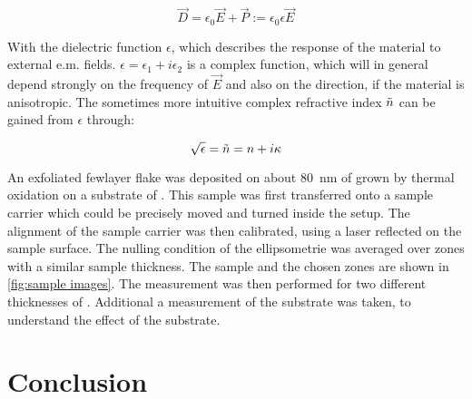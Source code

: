 \documentclass[english]{article}
\begin{document}
\begin{equation}
    \Vec{D}=\epsilon_0 \Vec{E} + \Vec{P} := \epsilon_0 \epsilon \Vec{E}
\end{equation}

With the dielectric function $\epsilon$, which describes the response of the material to external e.m. fields. $\epsilon=\epsilon_1 +i \epsilon_2$ is a complex function, which will in general depend strongly on the frequency of $\Vec{E}$ and also on the direction, if the material is anisotropic. The sometimes more intuitive complex refractive index $\Tilde{n}$ can be gained from $\epsilon$ through:

\begin{equation}
    \sqrt{\epsilon}= \Tilde{n}= n+ i\kappa
\end{equation}


An exfoliated  fewlayer flake was deposited on about \SI{80}{nm} of  grown by thermal oxidation on a substrate of . This sample was first transferred onto a sample carrier which could be precisely moved and turned inside the setup. The alignment of the sample carrier was then calibrated, using a laser reflected on the sample surface. The nulling condition of the ellipsometrie was averaged over zones with a similar sample thickness. The sample and the chosen zones are shown in  \cref{fig:sample images}. The measurement was then performed for two different thicknesses of . Additional a measurement of the  substrate was taken, to understand the effect of the substrate.


\section{Conclusion}
\end{document}
